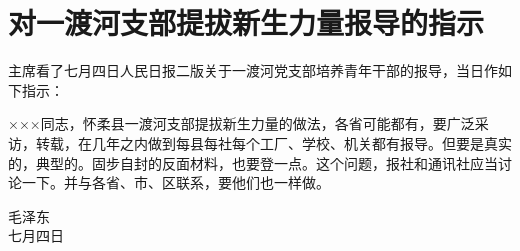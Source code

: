 \section[对一渡河支部提拔新生力量报导的指示（一九六四年七月四日）]{对一渡河支部提拔新生力量报导的指示}


主席看了七月四日人民日报二版关于一渡河党支部培养青年干部的报导，当日作如下指示：

×××同志，怀柔县一渡河支部提拔新生力量的做法，各省可能都有，要广泛采访，转载，在几年之内做到每县每社每个工厂、学校、机关都有报导。但要是真实的，典型的。固步自封的反面材料，也要登一点。这个问题，报社和通讯社应当讨论一下。并与各省、市、区联系，要他们也一样做。
{\raggedleft 毛泽东\\七月四日\par}



